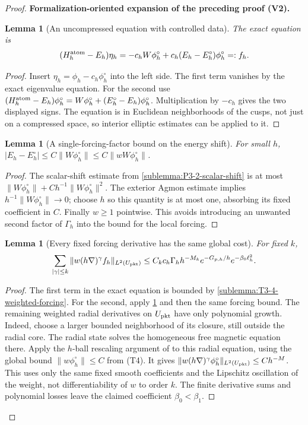 \documentclass[11pt]{article}
\newtheorem{lemma}[theorem]{Lemma}
\newcommand{\formalisationparentid}{X}
\newenvironment{formalisationaddition}[1]{\par\medskip\begingroup\color{blue}\def\formalisationparentid{#1}\setcounter{formalizationsublemma}{0}\let\lemma\formalizationsublemma\let\endlemma\endformalizationsublemma
  \def\Eo{\mathcal E_h^\circ}\def\EE{\mathcal E_h}\def\phio{\phi_h^\circ}\def\phih{\phi_h}\def\Ho{H_h^{\rm atom}(v^\circ)}\def\Ha{H_h^{\rm atom}}\def\HL{H_h^{L}}\def\Dh{D_h}\def\Log{\operatorname{Log}}\def\ellh{\ell_h}\def\Gp{G_{p,h}}\def\Ast{A_{*,h}}\def\ahat{\widehat{\mathfrak a}_h}\def\ah{\mathfrak a_h}\def\rh{\widehat\rho_h}\def\deltah{\widehat\delta_h}\def\oldref##1{\textup{(##1)}}\def\interface##1{\par\noindent\textit{Analytical interface used here.} ##1\par}\def\finish{\par\noindent\textit{Conclusion of the formalization-oriented expansion.} }\par\noindent\textbf{Formalization-oriented expansion of the preceding proof (V2).}\par\smallskip
}{\par\endgroup\medskip
}
\begin{document}
\begin{proof}
\begin{formalisationaddition}{T3.4}
\begin{lemma}[An uncompressed equation with controlled data]\label{sublemma:T3-4-uncompressed}
The exact equation is
\[
 (\Ha-E_h)\eta_h=-c_hW\phio+c_h(E_h-E_h^\circ)\phio=:f_h.
\]
\end{lemma}
\begin{proof}
Insert $\eta_h=\phih-c_h\phio$ into the left side.
The first term vanishes by the exact eigenvalue equation.
For the second use
$(\Ha-E_h)\phio=W\phio+(E_h^\circ-E_h)\phio$.
Multiplication by $-c_h$ gives the two displayed signs.
The equation is in Euclidean neighborhoods of the cusps, not just on a
compressed space, so interior elliptic estimates can be applied to it.
\end{proof}

\begin{lemma}[A single-forcing-factor bound on the energy shift]\label{sublemma:T3-4-energy-forcing}
For small $h$,
$|E_h-E_h^\circ|\le C\|W\phio\|\le C\|wW\phio\|$.
\end{lemma}
\begin{proof}
The scalar-shift estimate from \ref{sublemma:P3-2-scalar-shift} is at most
$\|W\phio\|+Ch^{-1}\|W\phio\|^2$.
The exterior Agmon estimate implies $h^{-1}\|W\phio\|\to0$; choose
$h$ so this quantity is at most one, absorbing its fixed coefficient
in $C$. Finally $w\ge1$ pointwise.
This avoids introducing an unwanted second factor of $\Gamma_h$ into
the bound for the local forcing.
\end{proof}

\begin{lemma}[Every fixed forcing derivative has the same global cost]\label{sublemma:T3-4-forcing-derivatives}
For fixed $k$,
\[
 \sum_{|\gamma|\le k}\|w(h\nabla)^\gamma f_h\|_{L^2(U_{\rm pkt})}
 \le C_kc_h\Gamma_hh^{-M_k}e^{-G_{p,h}/h}e^{-\beta_0\ell_h^2}.
\]
\end{lemma}
\begin{proof}
The first term in the exact equation is bounded by
\ref{sublemma:T3-4-weighted-forcing}. For the second, apply
\ref{sublemma:T3-4-energy-forcing} and then the same forcing bound.
The remaining weighted radial derivatives on $U_{\rm pkt}$ have only
polynomial growth. Indeed, choose a larger bounded neighborhood of its
closure, still outside the radial core. The radial state solves the
homogeneous free magnetic equation there. Apply the $h$-ball rescaling
argument of  to this
radial equation, using the global bound $\|w\phio\|\le C$ from (T4).
It gives $\|w(h\nabla)^\gamma\phio\|_{L^2(U_{\rm pkt})}\le Ch^{-M}$.
This uses only the same fixed smooth coefficients and the Lipschitz
oscillation of the weight, not differentiability of $w$ to order $k$.
The finite derivative sums and polynomial losses leave the claimed
coefficient $\beta_0<\beta_1$.
\end{proof}


\end{formalisationaddition}
\end{proof}
\end{document}

